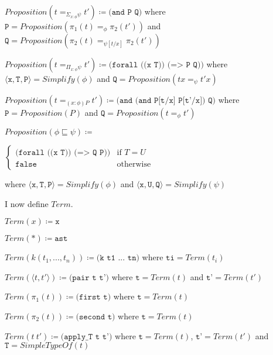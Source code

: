 \documentclass[12pt,a4paper,titlepage]{article}
\newcommand{\triple}[3]{\langle \texttt{#1} , \texttt{#2} , \texttt{#3} \rangle}
\begin{document}
    $Proposition(t =_{\Sigma_{x: \phi} \psi} t') \coloneqq
    \texttt{(and P Q)}$ where
    $\texttt{P} = Proposition(\pi_1 (t) =_\phi \pi_2 (t'))$ and
    $\texttt{Q} = Proposition(\pi_2 (t) =_{\psi[t/x]} \pi_2 (t'))$

    $Proposition(t =_{\Pi_{x: \phi} \psi} t') \coloneqq
    \texttt{(forall ((x T)) (=> P Q))}$
    where $\triple{x}{T}{P} = Simplify(\phi)$ and $\texttt{Q} = Proposition(tx =_\psi t'x)$

    $Proposition(t =_{(x: \phi)P} t') \coloneqq
    \texttt{(and (and P[t/x] P[t'/x]) Q)}$
    where $\texttt{P} = Proposition(P)$ and
    $\texttt{Q} = Proposition(t =_\phi t')$

    $Proposition(\phi \sqsubseteq \psi) \coloneqq$

    $\begin{cases}
        \texttt{(forall ((x T)) (=> Q P))} & \text{if } T=U\\
        \texttt{false} & \text{otherwise}
    \end{cases}$

    where $\triple{x}{T}{P} = Simplify(\phi)$ and $\triple{x}{U}{Q} = Simplify(\psi)$

    I now define $Term$.

    $Term(x) \coloneqq \texttt{x}$

    $Term(\ast) \coloneqq \texttt{ast}$

    $Term(k(t_1, ..., t_n)) \coloneqq \texttt{(k t1 ... tn)}$ where $\texttt{ti} = Term(t_i)$

    $Term(\langle t, t' \rangle) \coloneqq \texttt{(pair t t')}$
    where $\texttt{t} = Term(t)$ and $\texttt{t'} = Term(t')$

    $Term(\pi_1 (t)) \coloneqq \texttt{(first t)}$ where $\texttt{t} = Term(t)$

    $Term(\pi_2 (t)) \coloneqq \texttt{(second t)}$ where $\texttt{t} = Term(t)$

    $Term(t\ t') \coloneqq \texttt{(apply\_T t t')}$
    where $\texttt{t} = Term(t)$, $\texttt{t'} = Term(t')$ and $\texttt{T} = SimpleTypeOf(t)$
\end{document}

